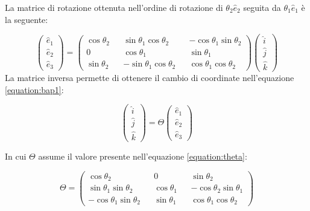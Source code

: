 La matrice di rotazione ottenuta nell'ordine di rotazione di $\theta_{2}\hat{e}_{2}$ seguita da $\theta_{1}\hat{e}_{1}$ è la seguente:

\begin{equation}
	\begin{pmatrix}
		\hat{e}_{1} \\
		\hat{e}_{2} \\
		\hat{e}_{3}
	\end{pmatrix}=
	\begin{pmatrix}
		\cos\theta_{2}		&&		\sin\theta_{1}\cos\theta_{2}		&&		-\cos\theta_{1}\sin\theta_{2}		\\
		0					&&		\cos\theta_{1}						&&		\sin\theta_{1}						\\
		\sin\theta_{2}		&&		-\sin\theta_{1}\cos\theta_{2}		&&		\cos\theta_{1}\cos\theta_{2}
	\end{pmatrix}
	\begin{pmatrix}
		\hat{i}		\\
		\hat{j}		\\
		\hat{k}
	\end{pmatrix}
\end{equation}
\newpage
La matrice inversa permette di ottenere il cambio di coordinate nell'equazione \ref{equation:bap1}:

\begin{equation}
	\begin{pmatrix}
		\hat{i}	\\
		\hat{j} \\
		\hat{k}
	\end{pmatrix}=
	\Theta
	\begin{pmatrix}
		\hat{e}_{1} \\
		\hat{e}_{2} \\
		\hat{e}_{3}
	\end{pmatrix}
	\label{equation:bap1}
\end{equation}

In cui $\Theta$ assume il valore presente nell'equazione \ref{equation:theta}:

\begin{equation}
	\Theta=
	\begin{pmatrix}
		\cos\theta_{2}					&&		0					&&		\sin\theta_{2}					\\
		\sin\theta_{1}\sin\theta_{2}	&&		\cos\theta_{1}		&&		-\cos\theta_{2}\sin\theta_{1}	\\
		-\cos\theta_{1}\sin\theta_{2}	&&		\sin\theta_{1}		&&		\cos\theta_{1}\cos\theta_{2}
	\end{pmatrix}
	\label{equation:theta}
\end{equation}

